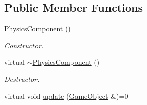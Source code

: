 \subsection*{Public Member Functions}
\begin{DoxyCompactItemize}
\item 
\hypertarget{classPhysicsComponent_aeb544a2a04cde8f050c6a51ec436ec4e}{\hyperlink{classPhysicsComponent_aeb544a2a04cde8f050c6a51ec436ec4e}{Physics\-Component} ()}\label{classPhysicsComponent_aeb544a2a04cde8f050c6a51ec436ec4e}

\begin{DoxyCompactList}\small\item\em Constructor. \end{DoxyCompactList}\item 
\hypertarget{classPhysicsComponent_afadf481ee69c12d205435ede58da6121}{virtual \hyperlink{classPhysicsComponent_afadf481ee69c12d205435ede58da6121}{$\sim$\-Physics\-Component} ()}\label{classPhysicsComponent_afadf481ee69c12d205435ede58da6121}

\begin{DoxyCompactList}\small\item\em Destructor. \end{DoxyCompactList}\item 
\hypertarget{classPhysicsComponent_a5498919fee09ce15271a5c273c2dc836}{virtual void \hyperlink{classPhysicsComponent_a5498919fee09ce15271a5c273c2dc836}{update} (\hyperlink{classGameObject}{Game\-Object} \&)=0}\label{classPhysicsComponent_a5498919fee09ce15271a5c273c2dc836}


\end{DoxyCompactItemize}
